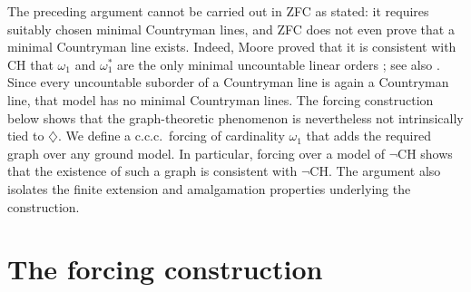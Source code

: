 \documentclass{amsart}
\numberwithin{equation}{section}
\theoremstyle{definition}
\theoremstyle{remark}
\begin{document}
The preceding argument cannot be carried out in ZFC as stated: it
requires suitably chosen minimal Countryman lines, and ZFC does not
even prove that a minimal Countryman line exists.  Indeed, Moore proved
that it is consistent with CH that $\omega_1$ and $\omega_1^*$ are the
only minimal uncountable linear orders \cite{Moore2007}; see also
\cite[Theorem~1.10]{CummingsEisworthMoore2024}.  Since every
uncountable suborder of a Countryman line is again a Countryman line,
that model has no minimal Countryman lines.  The forcing construction
below shows that the graph-theoretic phenomenon is nevertheless not
intrinsically tied to $\diamondsuit$.  We define a c.c.c.\ forcing of
cardinality $\omega_1$ that adds the required graph over any ground
model.  In particular, forcing over a model of $\neg$CH shows that the
existence of such a graph is consistent with $\neg$CH.  The argument
also isolates the finite extension and amalgamation properties
underlying the construction.

\section{The forcing construction}
\end{document}
